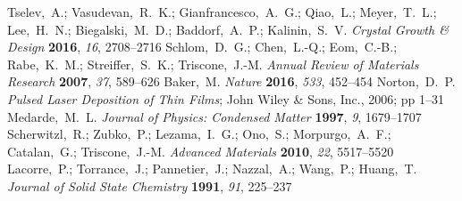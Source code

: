 \documentclass[aip,graphicx,numerical]{revtex4-1}
\begin{document}
\begin{mcitethebibliography}{33}
Tselev,~A.; Vasudevan,~R.~K.; Gianfrancesco,~A.~G.; Qiao,~L.; Meyer,~T.~L.;
  Lee,~H.~N.; Biegalski,~M.~D.; Baddorf,~A.~P.; Kalinin,~S.~V. \emph{Crystal
  Growth \& Design} \textbf{2016}, \emph{16}, 2708--2716\relax
\mciteBstWouldAddEndPuncttrue
\mciteSetBstMidEndSepPunct{\mcitedefaultmidpunct}
{\mcitedefaultendpunct}{\mcitedefaultseppunct}\relax
\EndOfBibitem
{}
Schlom,~D.~G.; Chen,~L.-Q.; Eom,~C.-B.; Rabe,~K.~M.; Streiffer,~S.~K.;
  Triscone,~J.-M. \emph{Annual Review of Materials Research} \textbf{2007},
  \emph{37}, 589--626\relax
\mciteBstWouldAddEndPuncttrue
\mciteSetBstMidEndSepPunct{\mcitedefaultmidpunct}
{\mcitedefaultendpunct}{\mcitedefaultseppunct}\relax
\EndOfBibitem
{}
Baker,~M. \emph{Nature} \textbf{2016}, \emph{533}, 452--454\relax
\mciteBstWouldAddEndPuncttrue
\mciteSetBstMidEndSepPunct{\mcitedefaultmidpunct}
{\mcitedefaultendpunct}{\mcitedefaultseppunct}\relax
\EndOfBibitem
{}
Norton,~D.~P. \emph{Pulsed Laser Deposition of Thin Films}; John Wiley \& Sons,
  Inc., 2006; pp 1--31\relax
\mciteBstWouldAddEndPuncttrue
\mciteSetBstMidEndSepPunct{\mcitedefaultmidpunct}
{\mcitedefaultendpunct}{\mcitedefaultseppunct}\relax
\EndOfBibitem
{}
Medarde,~M.~L. \emph{Journal of Physics: Condensed Matter} \textbf{1997},
  \emph{9}, 1679--1707\relax
\mciteBstWouldAddEndPuncttrue
\mciteSetBstMidEndSepPunct{\mcitedefaultmidpunct}
{\mcitedefaultendpunct}{\mcitedefaultseppunct}\relax
\EndOfBibitem
{}
Scherwitzl,~R.; Zubko,~P.; Lezama,~I.~G.; Ono,~S.; Morpurgo,~A.~F.;
  Catalan,~G.; Triscone,~J.-M. \emph{Advanced Materials} \textbf{2010},
  \emph{22}, 5517--5520\relax
\mciteBstWouldAddEndPuncttrue
\mciteSetBstMidEndSepPunct{\mcitedefaultmidpunct}
{\mcitedefaultendpunct}{\mcitedefaultseppunct}\relax
\EndOfBibitem
{}
Lacorre,~P.; Torrance,~J.; Pannetier,~J.; Nazzal,~A.; Wang,~P.; Huang,~T.
  \emph{Journal of Solid State Chemistry} \textbf{1991}, \emph{91},
  225--237\relax
\mciteBstWouldAddEndPuncttrue
\mciteSetBstMidEndSepPunct{\mcitedefaultmidpunct}
{\mcitedefaultendpunct}{\mcitedefaultseppunct}\relax
\EndOfBibitem

\end{mcitethebibliography}
\end{document}
